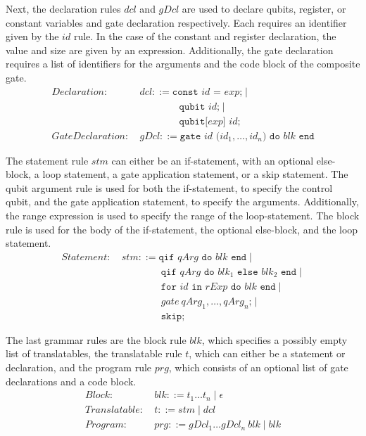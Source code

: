 Next, the declaration rules $dcl$ and $gDcl$ are used to declare qubits, register, or constant variables and gate declaration respectively. Each requires an identifier given by the $id$ rule. In the case of the constant and register declaration, the value and size are given by an expression. Additionally, the gate declaration requires a list of identifiers for the arguments and the code block of the composite gate.
\begin{align*}
    Declaration: \ & dcl ::= \texttt{const } id \texttt{ = } exp \texttt{;} \mid \\
                 & \quad \quad \quad \quad \texttt{qubit } id \texttt{;} \mid \\
                 & \quad \quad \quad \quad \texttt{qubit[} exp \texttt{] } id \texttt{;}\\
    GateDeclaration: \ & gDcl::= \texttt{gate } id \texttt{ (}id_1, \dots, id_n\texttt{) do } blk \texttt{ end}
\end{align*}

The statement rule $stm$ can either be an if-statement, with an optional else-block, a loop statement, a gate application statement, or a skip statement. The qubit argument rule is used for both the if-statement, to specify the control qubit, and the gate application statement, to specify the arguments. Additionally, the range expression is used to specify the range of the loop-statement. The block rule is used for the body of the if-statement, the optional else-block, and the loop statement.
\begin{align*}
    Statement: \ & stm ::= \texttt{qif } qArg \texttt{ do }  blk \texttt{ end} \mid\\
                 & \quad \quad \quad \quad \texttt{qif } qArg \texttt{ do }  blk_1 \texttt{ else } blk_2 \texttt{ end} \mid\\
                 & \quad \quad \quad \quad \texttt{for } id \texttt{ in } rExp \texttt{ do } blk \texttt{ end} \mid \\
                 & \quad \quad \quad \quad gate \ qArg_1, \dots, qArg_n \texttt{;} \mid \\
                 & \quad \quad \quad \quad \texttt{skip;}
\end{align*}

The last grammar rules are the block rule $blk$, which specifies a possibly empty list of translatables, the translatable rule $t$, which can either be a statement or declaration, and the program rule $prg$, which consists of an optional list of gate declarations and a code block. 
\begin{align*}
    Block: \ & blk::= t_1 \dots t_n \mid \epsilon\\
    Translatable : \ & t::= stm \mid dcl\\
    Program: \ & prg ::= gDcl_1 \dots gDcl_n \ blk \mid blk 
\end{align*}

